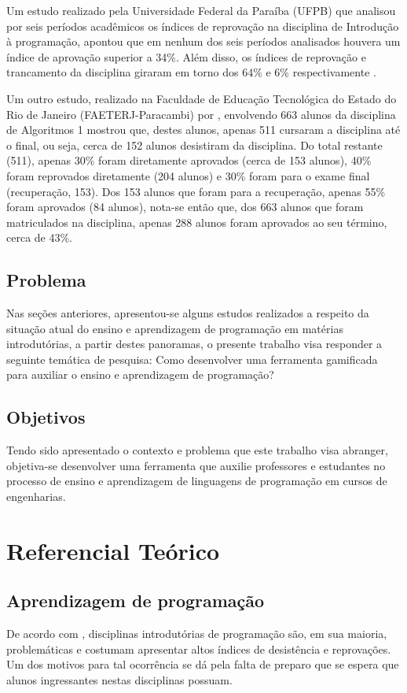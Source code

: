 Um estudo realizado pela Universidade Federal da Paraíba (UFPB) que analisou por seis períodos 
acadêmicos os índices de reprovação na disciplina de Introdução à programação, apontou que 
em nenhum dos seis períodos analisados houvera um índice de aprovação superior a 34\%. Além disso,
os índices de reprovação e trancamento da disciplina giraram em torno dos 64\% e 6\% respectivamente \cite{SBIE6739}.

Um outro estudo, realizado na Faculdade de Educação Tecnológica do Estado do Rio de Janeiro (FAETERJ-Paracambi) por , 
envolvendo 663 alunos da disciplina de Algoritmos 1 mostrou que, destes alunos, apenas 511 cursaram a disciplina 
até o final, ou seja, cerca de 152 alunos desistiram da disciplina. Do total restante (511), apenas 30\% foram
diretamente aprovados (cerca de 153 alunos), 40\% foram reprovados diretamente (204 alunos) e 30\% foram para o exame final (recuperação, 153).
Dos 153 alunos que foram para a recuperação, apenas 55\% foram aprovados (84 alunos), nota-se então que, dos 663 alunos que
foram matriculados na disciplina, apenas  288 alunos foram aprovados ao seu término, cerca de 43\%.

\section{Problema}
Nas seções anteriores, apresentou-se alguns estudos realizados a respeito da situação atual do ensino e aprendizagem
de programação em matérias introdutórias, a partir destes panoramas, o presente trabalho visa responder a seguinte temática
de pesquisa:
Como desenvolver uma ferramenta gamificada para auxiliar o ensino e aprendizagem de programação?
 
\section{Objetivos}
Tendo sido apresentado o contexto e problema que este trabalho visa abranger, objetiva-se
desenvolver uma ferramenta que auxilie professores e estudantes no processo de ensino e aprendizagem
de linguagens de programação em cursos de engenharias.

\chapter[Referencial Teórico]{Referencial Teórico}

\section{Aprendizagem de programação}
De acordo com , disciplinas introdutórias de programação são, em sua maioria, problemáticas e costumam apresentar
altos índices de desistência e reprovações. Um dos motivos para tal ocorrência se dá pela falta de preparo que se espera que alunos
ingressantes nestas disciplinas possuam.

